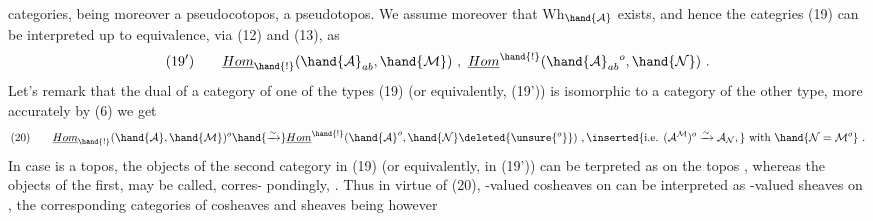 
\hand{\uline{\textcolor{black}{additive}}} categories,  being moreover a pseudocotopos,  a pseudotopos.
We assume moreover that Wh$_{\hand{\mathcal{A}}}$ exists, and hence the categries (19) can
be interpreted up to equivalence, via (12) and (13), as
\[ (19') \qquad \underline{Hom}_{\hand{!}}(\hand{\mathcal{A}}_{ab},\hand{\mathcal{M}}) \ , \ \underline{Hom}^{\hand{!}}(\hand{\mathcal{A}}_{ab}{}^{o},\hand{\mathcal{N}}) \ . \]
Let's remark that the dual of a category of one of the types (19)
(or equivalently, (19')) is isomorphic to a category of the other type,
more accurately by (6) we get
\[ (20) \qquad \underline{Hom}_{\hand{!}}(\hand{\mathcal{A}},\hand{\mathcal{M}})^{o} \hand{\xrightarrow{\sim}} \underline{Hom}^{\hand{!}}(\hand{\mathcal{A}}^{o},\hand{\mathcal{N}}\deleted{\unsure{{}^{o}}}) \ , \inserted{\text{i.e. }(\mathcal{A}^{\mathcal{M}})^{o} \xrightarrow{\sim} \mathcal{A}_{\mathcal{N}},} \text{ with } \hand{\mathcal{N}=\mathcal{M}^{o}} \ . \]
In case  is a topos, the objects of the second category  in (19)
(or equivalently, in (19')) can be terpreted as \hand{\uline{\textcolor{black}{-valued}}} \hand{\uline{\textcolor{black}{sheaves}}}
on the topos , whereas the objects of the first,  may be called, corres-%
pondingly, \hand{\uline{\textcolor{black}{cosheaves}}} \hand{\uline{\textcolor{black}{on}}}  \hand{\uline{\textcolor{black}{with values in}}} . Thus in virtue of (20)\deleted{\unsure{*}},
 -valued cosheaves on  can be interpreted as  -valued sheaves on
 , the corresponding categories of cosheaves and sheaves being however
